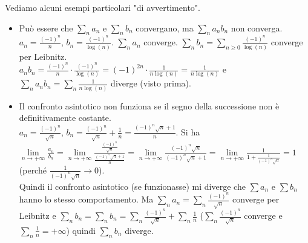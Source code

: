 \begin{example}
Vediamo alcuni esempi particolari "di avvertimento".
\begin{itemize}
    \item Può essere che $\sum_n a_n$ e $\sum_n b_n$ convergano, ma $\sum_n a_nb_n$ non converga.\\
    $a_n = \frac{(-1)^n}{n}$, $b_n = \frac{(-1)^n}{\log(n)}$. $\sum_n a_n$ converge. $\sum_n b_n = \sum_{n \geq 0} \frac{(-1)^n}{\log(n)}$ converge per Leibnitz.\\
    $a_nb_n = \frac{(-1)^n}{n} \cdot \frac{(-1)^n}{\log(n)} = (-1)^{2n}\cdot \frac{1}{n\log(n)} = \frac{1}{n\log(n)}$ e $\sum_n a_nb_n = \sum_n \frac{1}{n\log(n)}$ diverge (visto prima).
    \item Il confronto asintotico non funziona se il segno della successione non è definitivamente costante.\\
    $a_n = \frac{(-1)^n}{\sqrt{n}}$, $b_n = \frac{(-1)^n}{\sqrt{n}} + \frac{1}{n} = \frac{(-1)^n \sqrt{n} + 1}{n}$. Si ha $\lim\limits_{n\to +\infty}\frac{a_n}{b_n} = \lim\limits_{n\to +\infty}\frac{\frac{(-1)^n}{\sqrt{n}}}{\frac{(-1)^n\sqrt{n}+1}{n}} = \lim\limits_{n\to +\infty} \frac{(-1)^n \sqrt{n}}{(-1)^n \sqrt{n} + 1} = \lim\limits_{n\to +\infty}\frac{1}{1 + \frac{1}{(-1)^n \sqrt{n}}} = 1$ (perché $ \frac{1}{(-1)^n \sqrt{n}} \to 0$).\\
    Quindi il confronto asintotico (se funzionasse) mi diverge che $\sum a_n$ e $\sum b_n$ hanno lo stesso comportamento. Ma $\sum_n a_n = \sum_n \frac{(-1)^n}{\sqrt{n}}$ converge per Leibnitz e $\sum_n b_n = \sum_n b_n = \sum_n \frac{(-1)^n}{\sqrt{n}} + \sum_n \frac{1}{n}$ ($\sum_n \frac{(-1)^n}{\sqrt{n}}$ converge e $\sum_n \frac{1}{n} = +\infty$) quindi $\sum_n b_n$ diverge.
\end{itemize}
\end{example}